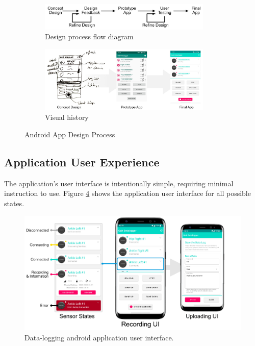\begin{figure}[!htb]
    \centering
    \begin{subfigure}[b]{\textwidth}
        \includegraphics[width=0.9\textwidth]{content/3-Methods/App_design_process.jpg}
        \caption{Design process flow diagram}
        \label{fig:app-flow-diagram}
    \end{subfigure}

    \begin{subfigure}[b]{\textwidth}
        \includegraphics[width=0.9\textwidth]{content/3-Methods/App_visual_history.jpg}
        \caption{Visual history}
        \label{fig:app-visual-history}
    \end{subfigure}

    \caption{Android App Design Process}
    \label{fig:app-design-process}
\end{figure}

\subsection{Application User Experience}
The application's user interface is intentionally simple, requiring minimal instruction to use. Figure \ref{fig:methods-app-user-interface} shows the application user interface for all possible states.

\begin{figure}[!htb]
    \centering
    \includegraphics[width=\textwidth]{content/3-Methods/User_Interface.pdf}
    \caption{Data-logging android application user interface.}
    \label{fig:methods-app-user-interface}
\end{figure}

